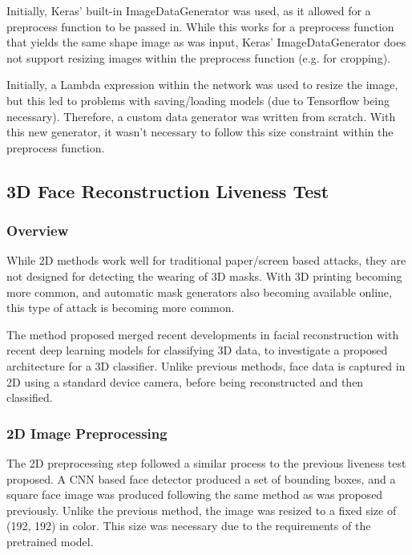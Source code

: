 \documentclass[10pt,a4paper]{article}
\begin{document}
                    Initially, Keras' built-in ImageDataGenerator was used, as it allowed for a preprocess function to be passed in. While this works for a preprocess function that yields the same shape image
                    as was input, Keras' ImageDataGenerator does not support resizing images within the preprocess function (e.g. for cropping).

                    Initially, a Lambda expression within the network was used to resize the image, but this led to problems with saving/loading models (due to Tensorflow being necessary).
                    Therefore, a custom data generator was written from scratch. With this new generator, it wasn't necessary to follow this size constraint within the preprocess function.


    \subsection{3D Face Reconstruction Liveness Test}
        \subsubsection{Overview}
            While 2D methods work well for traditional paper/screen based attacks, they are not designed for detecting the wearing of 3D masks. With 3D printing
            becoming more common, and automatic mask generators also becoming available online, this type of attack is becoming more common.

            The method proposed merged recent developments in facial reconstruction with recent deep learning models for classifying 3D data, to investigate a proposed
            architecture for a 3D classifier. Unlike previous methods, face data is captured in 2D using a standard device camera, before being reconstructed and then classified.

        \subsubsection{2D Image Preprocessing}
            The 2D preprocessing step followed a similar process to the previous liveness test proposed. A CNN based face detector produced a set of bounding boxes, and a square face image was produced
            following the same method as was proposed previously. Unlike the previous method, the image was resized to a fixed size of (192, 192) in color. This size was necessary due to the requirements
            of the pretrained model.
\end{document}
